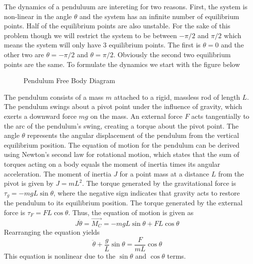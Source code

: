 The dynamics of a penduluum are intereting for two reasons. First, the system is non-linear in the angle $\theta$ and the system has an infinite number of equilibrium points. Half of the equilibrium points are also unstable. For the sake of this problem though we will restrict the system to be between $-\pi/2$ and $\pi/2$ which means the system will only have 3 equilibrium points. The first is $\theta=0$ and the other two are $\theta=-\pi/2$ and $\theta=\pi/2$. Obviously the second two equilibrium points are the same. To formulate the dynamics we start with the figure below
\begin{figure}[H]
    \centering
    \caption{Pendulum Free Body Diagram}
\end{figure}
The pendulum consists of a mass $m$ attached to a rigid, massless rod of length $L$. The pendulum swings about a pivot point under the influence of gravity, which exerts a downward force $mg$ on the mass. An external force $F$ acts tangentially to the arc of the pendulum's swing, creating a torque about the pivot point. The angle $\theta$ represents the angular displacement of the pendulum from the vertical equilibrium position. The equation of motion for the pendulum can be derived using Newton's second law for rotational motion, which states that the sum of torques acting on a body equals the moment of inertia times its angular acceleration. The moment of inertia $J$ for a point mass at a distance $L$ from the pivot is given by $J = mL^2$. The torque generated by the gravitational force is $\tau_g = -mgL \sin{\theta}$, where the negative sign indicates that gravity acts to restore the pendulum to its equilibrium position. The torque generated by the external force is $\tau_F = FL \cos{\theta}$. Thus, the equation of motion is given as
\begin{equation}
    J\ddot{\theta} = \vec{M_C} = -mgL \sin{\theta} + FL \cos{\theta}
\end{equation}
Rearranging the equation yields
\begin{equation}
    \ddot{\theta} + \frac{g}{L} \sin{\theta} = \frac{F}{mL} \cos{\theta}
\end{equation}
This equation is nonlinear due to the $\sin{\theta}$ and $\cos{\theta}$ terms. 


